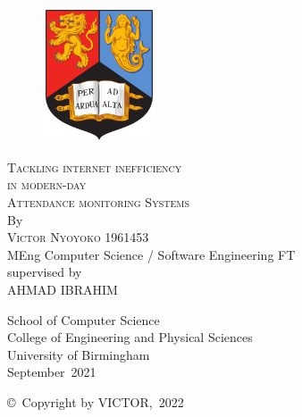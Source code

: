 \thispagestyle{empty}
\providecommand\pdfbookmark[3][]{} \pdfbookmark[0]{Title Page}{bm:Title}
\vspace*{1cm}
\begin{figure}[ht!]
\includegraphics[height=4cm]{frontmatter/images/BirminghamUniversityCrest.png}
\end{figure}
\vfill
\begin{flushleft}
\textsc{\huge{Tackling internet inefficiency }}\\[0.5em]
\textsc{\huge{in modern-day}}\\[0.5em]
\textsc{\huge{Attendance monitoring Systems}}\\[0.5em]
\vfill
By\\[\baselineskip]
\textsc{\Large{Victor Nyoyoko}}
\vfill
1961453\\[-0.8em]
MEng Computer Science / Software Engineering FT\\[-0.8em]
\vfill
supervised by\\[-0.8em]
\vfill
\MakeUppercase{AHMAD IBRAHIM} \\[\baselineskip]
\end{flushleft}
\begin{flushright}
School of Computer Science\\[-0.8em]
College of Engineering and Physical Sciences\\[-0.8em]
University of Birmingham\\[-0.8em]
September~2021 \\[\baselineskip]
\end{flushright}
\copyright\ Copyright by \MakeUppercase{\@Nyoyoko Victor},~\@2022\\
\clearpage

